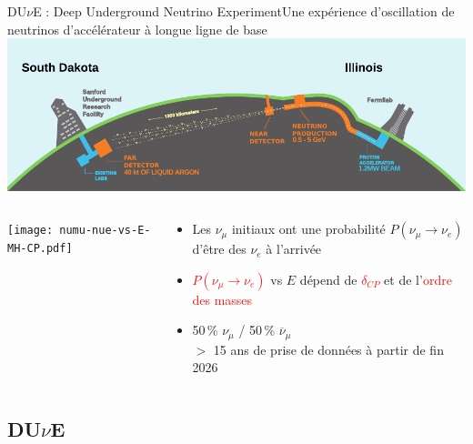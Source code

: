     \begin{frame}{DU$\nu$E : Deep Underground Neutrino Experiment}{Une expérience d'oscillation de neutrinos d'accélérateur à longue ligne de base}
        \includegraphics[width=\textwidth]{./pictures/dune.pdf}\\
        \begin{scriptsize}
        \vspace{0.4cm}
        \begin{columns}
            \begin{column}{0.75\textwidth}
                \texttt{[image: numu-nue-vs-E-MH-CP.pdf]}
            \end{column}
            \hspace{-0.5cm}
            \begin{column}{0.35\textwidth}
                 \begin{itemize}
                     \item Les $\nu_{\mu}$ initiaux ont une probabilité $P(\nu_{\mu}\to\nu_e)$ d'être des $\nu_e$ à l'arrivée
                     \item \textcolor{red}{$P(\nu_{\mu}\to\nu_e)$} vs $E$ dépend de \textcolor{red}{$\delta_{CP}$} et de l'\textcolor{red}{ordre des masses}
                     \item 50\,\% $\nu_{\mu}$ / 50\,\% $\overline{\nu}_{\mu}$ \\ $>$ 15 ans de prise de données à partir de fin 2026
                 \end{itemize}
            \end{column}
        \end{columns}
        \end{scriptsize}
    \end{frame}
    
    \subsection{DU$\nu$E}
    
